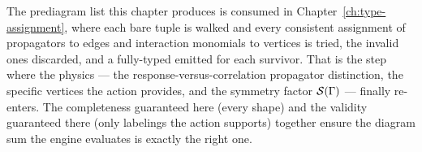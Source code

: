 The prediagram list this chapter produces is consumed in
Chapter~\ref{ch:type-assignment}, where each bare 
tuple is walked and every consistent assignment of propagators to edges and
interaction monomials to vertices is tried, the invalid ones discarded, and a
fully-typed  emitted for each survivor. That is the step where
the physics --- the response-versus-correlation propagator distinction, the
specific vertices the action provides, and the symmetry factor $\mathcal{S}(\Gamma)$ ---
finally re-enters. The completeness guaranteed here (every shape) and the validity
guaranteed there (only labelings the action supports) together ensure the diagram
sum the engine evaluates is exactly the right one.
